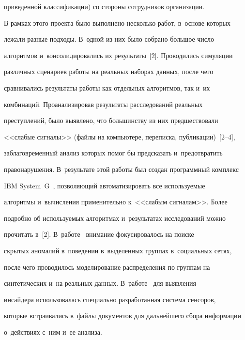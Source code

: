 приведенной классификации) со стороны сотрудников организации.


  


  В рамках этого проекта было выполнено несколько работ, в~основе которых 


лежали разные подходы. В~одной из них было собрано большое число 


алгоритмов и~консолидировались их результаты~[2]. Проводились симуляции 


различных сценариев работы на реальных наборах данных, после чего 


сравнивались результаты работы как отдельных алгоритмов, так и~их 


комбинаций. Проанализировав результаты расследований реальных 


преступлений, было выявлено, что большинству из них предшествовали 


<<слабые сигналы>> (файлы на компьютере, переписка, публикации)~[2--4], 


заблаговременный анализ которых помог бы предсказать и~предотвратить 


правонарушения. В~результате этой работы был создан программный комплекс 


IBM System~G~\cite{4-mt}, позволяющий автоматизировать все используемые 


алгоритмы и~вычисления применительно к~<<слабым сигналам>>. Более 


подробно об используемых алгоритмах и~результатах исследований можно 


прочитать в~[2]. В~работе~\cite{3-mt} внимание фокусировалось на поиске 


скрытых аномалий в~поведении в~выделенных группах в~социальных сетях, 


после чего проводилось моделирование распределения по группам на 


синтетических и~на реальных данных. В~работе~\cite{5-mt} для выявления 


инсайдера использовалась специально разработанная система сенсоров, 


которые встраивались в~файлы документов для дальнейшего сбора информации 


о~действиях с~ним и~ее анализа. 


{





}


